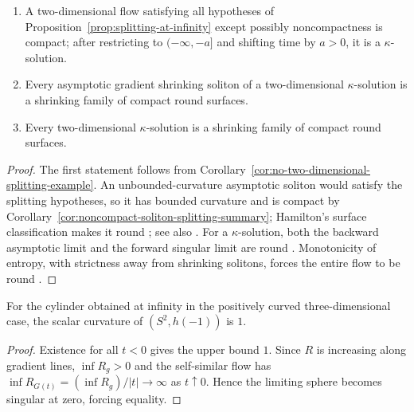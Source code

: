 \begin{corollary}\label{cor:two-dimensional-gradient-shrinking-soliton}
\label{2DGSS}
\begin{enumerate}
\item[(1)] A two-dimensional flow satisfying all hypotheses of
Proposition~\ref{prop:splitting-at-infinity} except possibly
noncompactness is compact; after restricting to $(-\infty,-a]$ and
shifting time by $a>0$, it is a $\kappa$-solution.
\item[(2)] Every asymptotic gradient shrinking soliton of a
two-dimensional $\kappa$-solution is a shrinking family of compact
round surfaces.
\item[(3)] Every two-dimensional $\kappa$-solution is a shrinking
family of compact round surfaces.
\end{enumerate}
\end{corollary}
\begin{proof}
\sketch
{}
The first statement follows from
Corollary~\ref{cor:no-two-dimensional-splitting-example}. An
unbounded-curvature asymptotic soliton would satisfy the splitting
hypotheses, so it has bounded curvature and is compact by
Corollary~\ref{cor:noncompact-soliton-splitting-summary}; Hamilton's
surface classification makes it round \cite{Hamiltonsurface}; see
also \cite{ChowKnopf}. For a $\kappa$-solution, both the backward
asymptotic limit and the forward singular limit are round
\cite{ChowKnopf}. Monotonicity of entropy, with
strictness away from shrinking solitons, forces the entire flow to
be round \cite{ChowKnopf}.
\end{proof}

\begin{claim}\label{claim:cylinder-limit-scalar-curvature-normalization}
For the cylinder obtained at infinity in the positively curved
three-dimensional case, the scalar curvature of $(S^2,h(-1))$ is
$1$.
\end{claim}
\begin{proof}
\sketch Existence for all $t<0$ gives the upper bound $1$. Since
$R$ is increasing along gradient lines, $\inf R_g>0$ and the
self-similar flow has $\inf R_{G(t)}=(\inf R_g)/|t|\to\infty$ as
$t\uparrow0$. Hence the limiting sphere becomes singular at zero,
forcing equality.
\end{proof}

